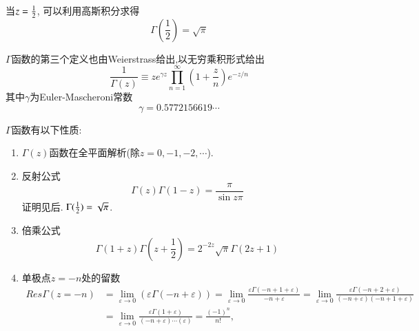 当$z={\frac{1}{2}}$, 可以利用高斯积分求得
$$
\Gamma\left(\frac{1}{2}\right)=\sqrt{\pi}
$$


$\Gamma$函数的第三个定义也由Weierstrass给出,以无穷乘积形式给出
\begin{equation}
\frac{1}{\Gamma(z)} \equiv z e^{\gamma z} \prod_{n=1}^{\infty}\left(1+\frac{z}{n}\right) e^{-z / n}
\end{equation}
其中$\gamma$为Euler-Mascheroni常数
$$
\gamma=0.5772156619 \cdots
$$

$\Gamma$函数有以下性质:
\begin{enumerate}
    \item $\Gamma(z)$函数在全平面解析(除$z=0, -1, -2, \cdots$).
    \item 反射公式
    $$
        \Gamma(z) \Gamma(1-z)=\frac{\pi}{\sin z \pi}
    $$ 证明见后. $\Gamma({\frac{1}{2}}) = \sqrt{\pi}$.
    \item 倍乘公式
    $$
    \Gamma(1+z) \Gamma\left(z+\frac{1}{2}\right)=2^{-2 z} \sqrt{\pi} \Gamma(2 z+1)
    $$
    \item 单极点$z=-n$处的留数
    $$
    \begin{aligned}
    Res \Gamma(z=-n) & =\lim _{\varepsilon \rightarrow 0}(\varepsilon \Gamma(-n+\varepsilon))=\lim _{\varepsilon \rightarrow 0} \frac{\varepsilon \Gamma(-n+1+\varepsilon)}{-n+\varepsilon}=\lim _{\varepsilon \rightarrow 0} \frac{\varepsilon \Gamma(-n+2+\varepsilon)}{(-n+\varepsilon)(-n+1+\varepsilon)} \\
    & =\lim _{\varepsilon \rightarrow 0} \frac{\varepsilon \Gamma(1+\varepsilon)}{(-n+\varepsilon) \cdots(\varepsilon)}=\frac{(-1)^{n}}{n !},
    \end{aligned}
    $$
\end{enumerate}

